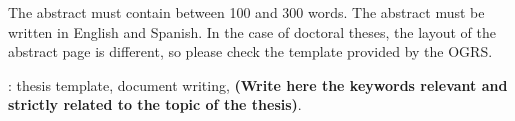 The abstract must contain between 100 and 300 words.  The abstract must be written in English and Spanish.  In the case of doctoral theses, the layout of the abstract page is different, so please check the template provided by the OGRS. \

\vfill
{}:  thesis template, document writing, {\bf (Write here the keywords relevant and strictly related to the topic of the thesis)}.
